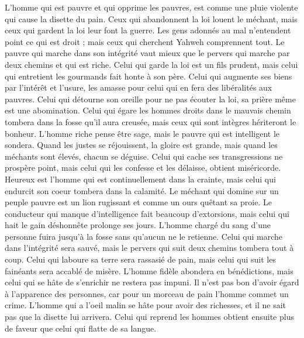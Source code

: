 \begin{multicols}{2}
L'homme qui est pauvre et qui opprime les pauvres, est comme une pluie violente qui cause la disette du pain.
Ceux qui abandonnent la loi louent le méchant, mais ceux qui gardent la loi leur font la guerre.
Les gens adonnés au mal n'entendent point ce qui est droit ; mais ceux qui cherchent Yahweh comprennent tout.
Le pauvre qui marche dans son intégrité vaut mieux que le pervers qui marche par deux chemins et qui est riche.
Celui qui garde la loi est un fils prudent, mais celui qui entretient les gourmands fait honte à son père.
Celui qui augmente ses biens par l'intérêt et l'usure, les amasse pour celui qui en fera des libéralités aux pauvres.
Celui qui détourne son oreille pour ne pas écouter la loi, sa prière même est une abomination.
Celui qui égare les hommes droits dans le mauvais chemin tombera dans la fosse qu'il aura creusée, mais ceux qui sont intègres hériteront le bonheur.
L'homme riche pense être sage, mais le pauvre qui est intelligent le sondera.
Quand les justes se réjouissent, la gloire est grande, mais quand les méchants sont élevés, chacun se déguise.
Celui qui cache ses transgressions ne prospère point, mais celui qui les confesse et les délaisse, obtient miséricorde.
Heureux est l'homme qui est continuellement dans la crainte, mais celui qui endurcit son coeur tombera dans la calamité.
Le méchant qui domine sur un peuple pauvre est un lion rugissant et comme un ours quêtant sa proie.
Le conducteur qui manque d'intelligence fait beaucoup d'extorsions, mais celui qui hait le gain déshonnête prolonge ses jours.
L'homme chargé du sang d'une personne fuira jusqu'à la fosse sans qu'aucun ne le retienne.
Celui qui marche dans l'intégrité sera sauvé, mais le pervers qui suit deux chemins tombera tout à coup.
Celui qui laboure sa terre sera rassasié de pain, mais celui qui suit les fainéants sera accablé de misère.
L'homme fidèle abondera en bénédictions, mais celui qui se hâte de s'enrichir ne restera pas impuni.
Il n'est pas bon d'avoir égard à l'apparence des personnes, car pour un morceau de pain l'homme commet un crime.
L'homme qui a l'oeil malin se hâte pour avoir des richesses, et il ne sait pas que la disette lui arrivera.
Celui qui reprend les hommes obtient ensuite plus de faveur que celui qui flatte de sa langue.

\end{multicols}
